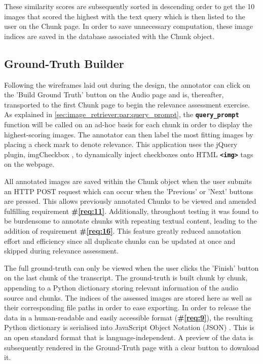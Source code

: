 \documentclass{l4proj}
\begin{document}
These similarity scores are subsequently sorted in descending order to get the 10 images that scored the highest with the text query which is then listed to the user on the Chunk page. In order to save unnecessary computation, these image indices are saved in the database associated with the Chunk object.


\subsection{Ground-Truth Builder}
Following the wireframes laid out during the design, the annotator can click on the 'Build Ground Truth' button on the Audio page and is, thereafter, transported to the first Chunk page to begin the relevance assessment exercise. As explained in \ref{sec:image_retriever:par:query_prompt}, the \textbf{\lstinline|query_prompt|} function will be called on an ad-hoc basis for each chunk in order to display the highest-scoring images. The annotator can then label the most fitting images by placing a check mark to denote relevance. This application uses the jQuery plugin, imgCheckbox \citep{imgcheckbox}, to dynamically inject checkboxes onto HTML \textbf{\lstinline|<img>|} tags on the webpage. 

All annotated images are saved within the Chunk object when the user submits an HTTP POST request which can occur when the 'Previous' or 'Next' buttons are pressed. This allows previously annotated Chunks to be viewed and amended fulfilling requirement \textbf{\#\ref{req:11}}. Additionally, throughout testing it was found to be burdensome to annotate chunks with repeating textual content, leading to the addition of requirement \textbf{\#\ref{req:16}}. This feature greatly reduced annotation effort and efficiency since all duplicate chunks can be updated at once and skipped during relevance assessment.

The full ground-truth can only be viewed when the user clicks the 'Finish' button on the last chunk of the transcript. The ground-truth is built chunk by chunk, appending to a Python dictionary storing relevant information of the audio source and chunks. The indices of the assessed images are stored here as well as their corresponding file paths in order to ease exporting. In order to release the data in a human-readable and easily accessible format (\textbf{\#\ref{req:9}}), the resulting Python dictionary is serialised into JavaScript Object Notation (JSON) \citep{json}. This is an open standard format that is language-independent. A preview of the data is subsequently rendered in the Ground-Truth page with a clear button to download it.
\end{document}
